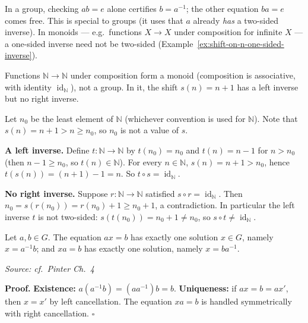 \documentclass[11pt]{report}
\renewenvironment{proof}[1][Proof]{\noindent\textbf{#1.} }{\hfill$\square$\par\vspace{5pt}}
\newcommand{\srcline}[1]{\par\hfill{\footnotesize\textit{Source: #1}}}
\begin{document}
\begin{rembox}\label{rem:why-one-sided-suffices-here-but-not-general}
In a group, checking $ab = e$ alone certifies $b = a^{-1}$; the other equation $ba = e$ comes free. This is special to groups (it uses that $a$ already \emph{has} a two-sided inverse). In monoids --- e.g.\ functions $X \to X$ under composition for infinite $X$ --- a one-sided inverse need not be two-sided (Example~\ref{ex:shift-on-n-one-sided-inverse}).
\end{rembox}

\begin{exbox}\label{ex:shift-on-n-one-sided-inverse}
Functions $\mathbb{N} \to \mathbb{N}$ under composition form a monoid (composition is associative, with identity $\operatorname{id}_{\mathbb{N}}$), not a group. In it, the shift $s(n) = n + 1$ has a left inverse but no right inverse.

Let $n_0$ be the least element of $\mathbb{N}$ (whichever convention is used for $\mathbb{N}$). Note that $s(n) = n + 1 > n \geq n_0$, so $n_0$ is not a value of $s$.

\textbf{A left inverse.} Define $t \colon \mathbb{N} \to \mathbb{N}$ by $t(n_0) = n_0$ and $t(n) = n - 1$ for $n > n_0$ (then $n - 1 \geq n_0$, so $t(n) \in \mathbb{N}$). For every $n \in \mathbb{N}$, $s(n) = n + 1 > n_0$, hence $t(s(n)) = (n + 1) - 1 = n$. So $t \circ s = \operatorname{id}_{\mathbb{N}}$.

\textbf{No right inverse.} Suppose $r \colon \mathbb{N} \to \mathbb{N}$ satisfied $s \circ r = \operatorname{id}_{\mathbb{N}}$. Then $n_0 = s(r(n_0)) = r(n_0) + 1 \geq n_0 + 1$, a contradiction. In particular the left inverse $t$ is not two-sided: $s(t(n_0)) = n_0 + 1 \neq n_0$, so $s \circ t \neq \operatorname{id}_{\mathbb{N}}$.
\end{exbox}

\begin{propbox}\label{prop:unique-solvability-linear-equations}
Let $a, b \in G$. The equation $ax = b$ has exactly one solution $x \in G$, namely $x = a^{-1} b$; and $xa = b$ has exactly one solution, namely $x = b a^{-1}$.
\srcline{cf.\ Pinter Ch.\ 4}
\end{propbox}

\begin{proof}
\textbf{Existence:} $a(a^{-1} b) = (a a^{-1}) b = b$. \textbf{Uniqueness:} if $ax = b = ax'$, then $x = x'$ by left cancellation. The equation $xa = b$ is handled symmetrically with right cancellation.
\end{proof}
\end{document}
